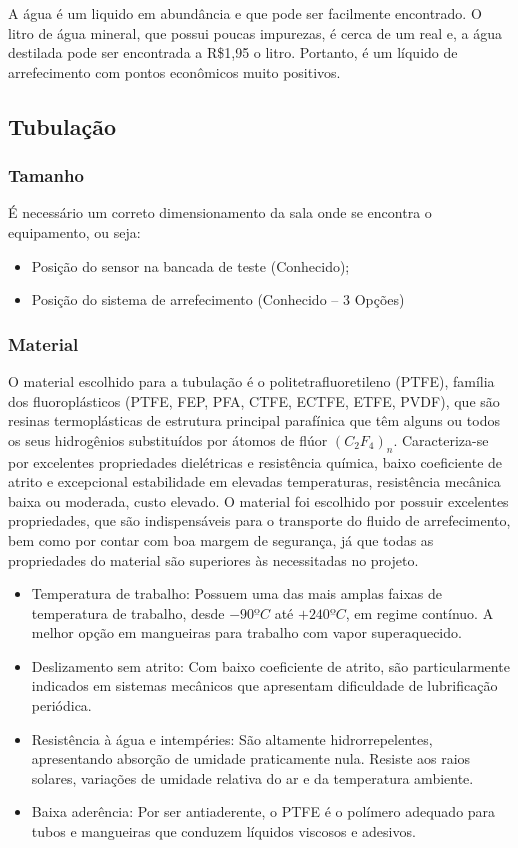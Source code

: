 A água é um liquido em abundância e que pode ser facilmente encontrado. O litro de água mineral, que possui poucas impurezas, é cerca de um real e, a água destilada pode ser encontrada a R\$1,95 o litro. Portanto, é um líquido de arrefecimento com pontos econômicos muito positivos.

\subsection{Tubulação}

\subsubsection{Tamanho}
É necessário um correto dimensionamento da sala onde se encontra o equipamento, ou seja:
\begin{itemize}
\item Posição do sensor na bancada de teste (Conhecido);
\item Posição do sistema de arrefecimento (Conhecido – 3 Opções)
\end{itemize}

\subsubsection{Material}
O material escolhido para a tubulação é o politetrafluoretileno (PTFE), família dos fluoroplásticos (PTFE, FEP, PFA, CTFE, ECTFE, ETFE, PVDF), que são resinas termoplásticas de estrutura principal parafínica que têm alguns ou todos os seus hidrogênios substituídos por átomos de flúor $(C_{2}F_{4})_{n}$. Caracteriza-se por excelentes propriedades dielétricas e resistência química, baixo coeficiente de atrito e excepcional estabilidade em elevadas temperaturas, resistência mecânica baixa ou moderada, custo elevado. 
O material foi escolhido por possuir excelentes propriedades, que são indispensáveis para o transporte do fluido de arrefecimento, bem como por contar com boa margem de segurança, já que todas as propriedades do material são superiores às necessitadas no projeto.

\begin{itemize}
\item Temperatura de trabalho: Possuem uma das mais amplas faixas de temperatura de trabalho, desde $-90ºC$ até $+240ºC$, em regime contínuo. A melhor opção em mangueiras para trabalho com vapor superaquecido.
\item Deslizamento sem atrito: Com baixo coeficiente de atrito, são particularmente indicados em sistemas mecânicos que apresentam dificuldade de lubrificação periódica.
\item Resistência à água e intempéries: São altamente hidrorrepelentes, apresentando absorção de umidade praticamente nula. Resiste aos raios solares, variações de umidade relativa do ar e da temperatura ambiente. 
\item Baixa aderência: Por ser antiaderente, o PTFE é o polímero adequado para tubos e mangueiras que conduzem líquidos viscosos e adesivos. 
\end{itemize}

